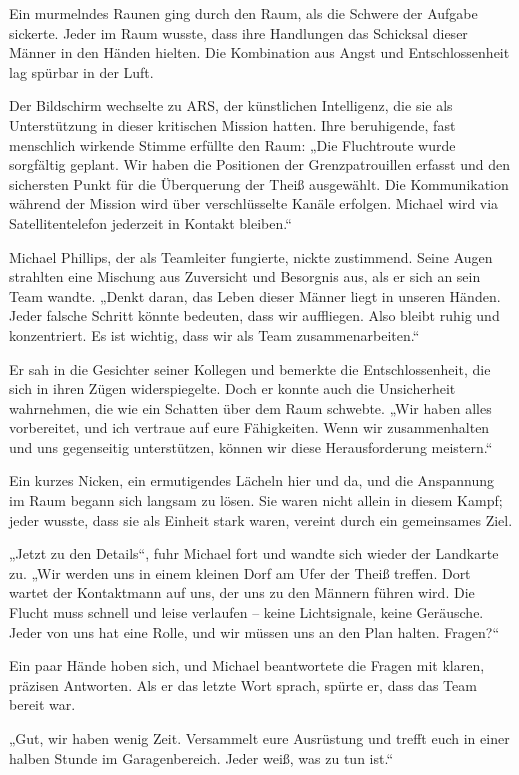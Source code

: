 \documentclass[
]{article}
\begin{document}
Ein murmelndes Raunen ging durch den Raum, als die Schwere der Aufgabe
sickerte. Jeder im Raum wusste, dass ihre Handlungen das Schicksal
dieser Männer in den Händen hielten. Die Kombination aus Angst und
Entschlossenheit lag spürbar in der Luft.

Der Bildschirm wechselte zu ARS, der künstlichen Intelligenz, die sie
als Unterstützung in dieser kritischen Mission hatten. Ihre beruhigende,
fast menschlich wirkende Stimme erfüllte den Raum: „Die Fluchtroute
wurde sorgfältig geplant. Wir haben die Positionen der Grenzpatrouillen
erfasst und den sichersten Punkt für die Überquerung der Theiß
ausgewählt. Die Kommunikation während der Mission wird über
verschlüsselte Kanäle erfolgen. Michael wird via Satellitentelefon
jederzeit in Kontakt bleiben.``

Michael Phillips, der als Teamleiter fungierte, nickte zustimmend. Seine
Augen strahlten eine Mischung aus Zuversicht und Besorgnis aus, als er
sich an sein Team wandte. „Denkt daran, das Leben dieser Männer liegt in
unseren Händen. Jeder falsche Schritt könnte bedeuten, dass wir
auffliegen. Also bleibt ruhig und konzentriert. Es ist wichtig, dass wir
als Team zusammenarbeiten.``

Er sah in die Gesichter seiner Kollegen und bemerkte die
Entschlossenheit, die sich in ihren Zügen widerspiegelte. Doch er konnte
auch die Unsicherheit wahrnehmen, die wie ein Schatten über dem Raum
schwebte. „Wir haben alles vorbereitet, und ich vertraue auf eure
Fähigkeiten. Wenn wir zusammenhalten und uns gegenseitig unterstützen,
können wir diese Herausforderung meistern.``

Ein kurzes Nicken, ein ermutigendes Lächeln hier und da, und die
Anspannung im Raum begann sich langsam zu lösen. Sie waren nicht allein
in diesem Kampf; jeder wusste, dass sie als Einheit stark waren, vereint
durch ein gemeinsames Ziel.

„Jetzt zu den Details``, fuhr Michael fort und wandte sich wieder der
Landkarte zu. „Wir werden uns in einem kleinen Dorf am Ufer der Theiß
treffen. Dort wartet der Kontaktmann auf uns, der uns zu den Männern
führen wird. Die Flucht muss schnell und leise verlaufen -- keine
Lichtsignale, keine Geräusche. Jeder von uns hat eine Rolle, und wir
müssen uns an den Plan halten. Fragen?{\kern0pt}``

Ein paar Hände hoben sich, und Michael beantwortete die Fragen mit
klaren, präzisen Antworten. Als er das letzte Wort sprach, spürte er,
dass das Team bereit war.

„Gut, wir haben wenig Zeit. Versammelt eure Ausrüstung und trefft euch
in einer halben Stunde im Garagenbereich. Jeder weiß, was zu tun ist.``
\end{document}
